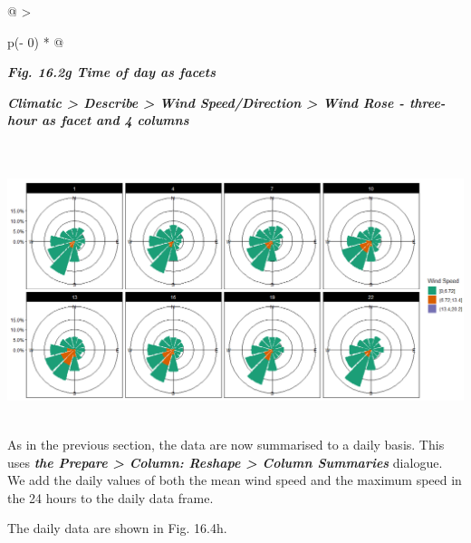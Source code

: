 \documentclass[
  letterpaper,
  DIV=11,
  numbers=noendperiod]{scrreprt}
\begin{document}
\begin{longtable}[]{@{}
  >{\raggedright\arraybackslash}p{(\columnwidth - 0\tabcolsep) * }@{}}
\toprule\noalign{}
\begin{minipage}[b]{\linewidth}\raggedright
\textbf{\emph{Fig. 16.2g Time of day as facets}}

\textbf{\emph{Climatic \textgreater{} Describe \textgreater{} Wind
Speed/Direction \textgreater{} Wind Rose - three-hour as facet and 4
columns}}
\end{minipage} \\
\midrule\noalign{}
\endhead
\bottomrule\noalign{}
\endlastfoot
\includegraphics[width=6.12628in,height=2.97762in]{figures/Fig16.4g.png} \\
\end{longtable}

As in the previous section, the data are now summarised to a daily
basis. This uses \textbf{\emph{the Prepare \textgreater{} Column:
Reshape \textgreater{} Column Summaries}} dialogue. We add the daily
values of both the mean wind speed and the maximum speed in the 24 hours
to the daily data frame.

The daily data are shown in Fig. 16.4h.
\end{document}
